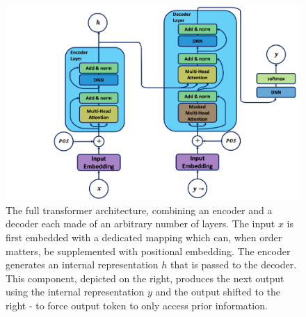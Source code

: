\begin{figure}[h!]
    \center
    \includegraphics[scale=0.5]{Images/ML/transformer.png}
    \caption{The full transformer architecture, combining an encoder and a decoder each made of an arbitrary number of layers. The input $x$ is first embedded with a dedicated mapping which can, when order matters, be supplemented with positional embedding. The encoder generates an internal representation $h$ that is passed to the decoder. This component, depicted on the right, produces the next output using the internal representation $y$ and the output shifted to the right - to force output token to only access prior information. } 
    \label{fig:tranfoArchi}
\end{figure}

